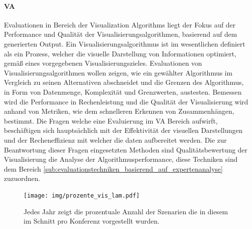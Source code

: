 \documentclass[draft=false
              ,paper=a4
              ,twoside=false
              ,fontsize=11pt
              ,headsepline
              ,BCOR10mm
              ,DIV11
              ]{scrbook}
\begin{document}
 \paragraph{VA} %
 \label{par:va}
 Evaluationen in Bereich der Visualization Algorithms liegt der Fokus auf der Performance und Qualität der Visualisierungsalgorithmen, basierend auf dem generierten Output. Ein Visualisierungsalgorithmus ist im wesentlichen definiert als ein Prozess, welcher die visuelle Darstellung von Informationen optimiert, gemäß eines vorgegebenen Visualisierungszieles. Evaluationen von Visualisierungsalgorithmen wollen zeigen, wie ein gewählter Algorithmus im Vergleich zu seinen Alternativen abschneidet und die Grenzen des Algorithmus, in Form von Datenmenge, Komplexität und Grenzwerten, austesten. Bemessen wird die Performance in Rechenleistung und die Qualität der Visualisierung wird anhand von Metriken, wie dem schnelleren Erkennen von Zusammenhängen, bestimmt. Die Fragen welche eine Evaluierung im VA Bereich aufwirft, beschäftigen sich hauptsächlich mit der Effektivität der visuellen Darstellungen und der Recheneffizienz mit welcher die daten aufbereitet werden. Die zur Beantwortung dieser Fragen eingesetzten Methoden sind Qualitätsbewertung der Visualisierung die Analyse der Algorithmusperformance, diese Techniken sind dem Bereich \ref{sub:evaluationstechniken_basierend_auf_expertenanalyse}  zuzuordnen. 

\begin{figure}[htbp]
  \centering
  \texttt{[image: img/prozente\_vis\_lam.pdf]}
  \caption{Jedes Jahr zeigt die prozentuale Anzahl der Szenarien die in diesem im Schnitt pro Konferenz vorgestellt wurden.}
  \label{fig:szenarien}
\end{figure}
\end{document}
